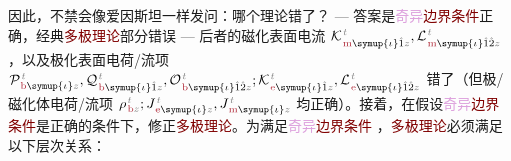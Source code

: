 因此，不禁会像爱因斯坦一样发问：哪个理论错了？ ---  答案是\textcolor{Plum}{奇异}\textcolor{Maroon}{边界条件}正确，经典\textcolor{Maroon}{多极理论}部分错误  ---  后者的磁化表面电流 ${\mathcal{K}}^{\;\!\mathcolor{gray}{t}}_{\;\!\textcolor{Maroon}{\text{m}} \symup{\iota}\hat{1} \mathcolor{gray}{z}},{\mathcal{L}}^{\;\!\mathcolor{gray}{t}}_{\;\!\textcolor{Maroon}{\text{m}} \symup{\iota}\hat{1}\hat{2} \mathcolor{gray}{z}}$，以及极化表面电荷/流项 ${\mathcal{P}}^{\;\!\mathcolor{gray}{t}}_{\;\!\textcolor{Maroon}{\text{b}} \symup{\iota} \mathcolor{gray}{z}},{\mathcal{Q}}^{\;\!\mathcolor{gray}{t}}_{\;\!\textcolor{Maroon}{\text{b}} \symup{\iota}\hat{1} \mathcolor{gray}{z}},{\mathcal{O}}^{\;\!\mathcolor{gray}{t}}_{\;\!\textcolor{Maroon}{\text{b}} \symup{\iota}\hat{1}\hat{2} \mathcolor{gray}{z}};{\mathcal{K}}^{\;\!\mathcolor{gray}{t}}_{\;\!\textcolor{Maroon}{\text{e}} \symup{\iota}\hat{1} \mathcolor{gray}{z}},{\mathcal{L}}^{\;\!\mathcolor{gray}{t}}_{\;\!\textcolor{Maroon}{\text{e}} \symup{\iota}\hat{1}\hat{2} \mathcolor{gray}{z}}$ 错了（但极/磁化体电荷/流项 ${\rho}^{\;\!\mathcolor{gray}{t}}_{\;\!\textcolor{Maroon}{\text{b}} \mathcolor{gray}{z}};{J}^{\;\!\mathcolor{gray}{t}}_{\;\!\textcolor{Maroon}{\text{e}} \symup{\iota} \mathcolor{gray}{z}},{J}^{\;\!\mathcolor{gray}{t}}_{\;\!\textcolor{Maroon}{\text{m}} \symup{\iota} \mathcolor{gray}{z}}$ 均正确）。接着，在假设\textcolor{Plum}{奇异}\textcolor{Maroon}{边界条件}是正确的条件下，修正\textcolor{Maroon}{多极理论}。为满足\textcolor{Plum}{奇异}\textcolor{Maroon}{边界条件} ，\textcolor{Maroon}{多极理论}必须满足以下层次关系：
